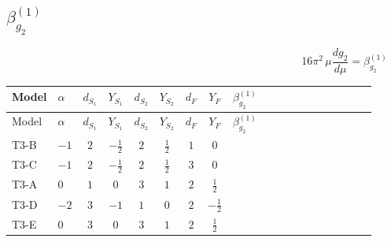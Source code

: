 \documentclass{article}
\begin{document}
\begin{landscape}
\section*{$\beta_{g_2}^{(1)}$}
\[16\pi^2\,\mu\frac{d g_2}{d\mu}=\beta_{g_2}^{(1)}\]
\tiny
\begin{longtable}{@{}llcccccc >{\raggedright\arraybackslash}p{0.54\linewidth}@{}}
\toprule
Model & $\alpha$ & $d_{S_1}$ & $Y_{S_1}$ & $d_{S_2}$ & $Y_{S_2}$ & $d_F$ & $Y_F$ & $\beta_{g_2}^{(1)}$ \\
\midrule
\endfirsthead
\toprule
Model & $\alpha$ & $d_{S_1}$ & $Y_{S_1}$ & $d_{S_2}$ & $Y_{S_2}$ & $d_F$ & $Y_F$ & $\beta_{g_2}^{(1)}$ \\
\midrule
\endhead
T3-B & $-1$ & $2$ & $-\frac{1}{2}$ & $2$ & $\frac{1}{2}$ & $1$ & $0$ & \scriptsize\adjustbox{max width=\linewidth}{$\begin{gathered} -\frac{17 {g_2}^3}{6}\end{gathered}$} \\
\midrule
T3-C & $-1$ & $2$ & $-\frac{1}{2}$ & $2$ & $\frac{1}{2}$ & $3$ & $0$ & \scriptsize\adjustbox{max width=\linewidth}{$\begin{gathered} \frac{7 {g_2}^3}{6}\end{gathered}$} \\
\midrule
T3-A & $0$ & $1$ & $0$ & $3$ & $1$ & $2$ & $\frac{1}{2}$ & \scriptsize\adjustbox{max width=\linewidth}{$\begin{gathered} -\frac{{g_2}^3}{2}\end{gathered}$} \\
\midrule
T3-D & $-2$ & $3$ & $-1$ & $1$ & $0$ & $2$ & $-\frac{1}{2}$ & \scriptsize\adjustbox{max width=\linewidth}{$\begin{gathered} -\frac{{g_2}^3}{2}\end{gathered}$} \\
\midrule
T3-E & $0$ & $3$ & $0$ & $3$ & $1$ & $2$ & $\frac{1}{2}$ & \scriptsize\adjustbox{max width=\linewidth}{$\begin{gathered} \frac{{g_2}^3}{6}\end{gathered}$} \\
\midrule
\bottomrule
\end{longtable}
\clearpage

\end{landscape}
\end{document}
